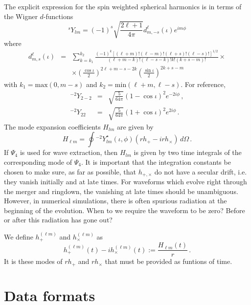 \documentclass{article}
\numberwithin{equation}{section}
\newcommand{\Ys}{{{}^sY}}
\newcommand{\Ytwo}{{{}^{-2}Y}}
\begin{document}
The explicit expression for the spin weighted spherical harmonics is
in terms of the Wigner $d$-functions
\begin{equation}
  \label{eq:5}
   \Ys_{lm} = (-1)^s\sqrt{\frac{2\ell+1}{4\pi}} d^\ell_{m,-s}(\iota)e^{im\phi}
\end{equation}
where
\begin{eqnarray}
  \label{eq:6}
  d^\ell_{m,s}(\iota) &=& \sum_{k = k_1}^{k_2}
    \frac{(-1)^k[(\ell+m)!(\ell-m)!(\ell+s)!(\ell-s)!]^{1/2}}{(\ell +m
      -k)!(\ell-s-k)!k!(k+s-m)!} \times \\ 
    &&\times \left(\frac{\cos\iota}{2}\right)^{2\ell+m-s-2k}\left(\frac{\sin\iota}{2}\right)^{2k+s-m}  
\end{eqnarray}
with $k_1 = \textrm{max}(0, m-s)$ and $k_2=\textrm{min}(\ell+m,
\ell-s)$.  For reference,
\begin{eqnarray}
  \label{eq:7}
  \Ytwo_{2-2} &=& \sqrt{\frac{5}{64\pi}}(1-\cos\iota)^2e^{-2i\phi}\,, \\
  \Ytwo_{22} &=& \sqrt{\frac{5}{64\pi}}(1+\cos\iota)^2e^{2i\phi} \,.
\end{eqnarray}
The mode expansion coefficients $H_{lm}$ are given by
\begin{equation}
  \label{eq:10}
  H_{\ell m} = \oint \Ytwo_{lm}^\star(\iota,\phi)(rh_+-irh_\times )\,d\Omega\,.
\end{equation}
If $\Psi_4$ is used for wave extraction, then $H_{lm}$ is given by two
time integrals of the corresponding mode of $\Psi_4$.  It is important
that the integration constants be chosen to make sure, as far as
possible, that $h_{+,\times}$ do not have a secular drift, i.e. they
vanish initially and at late times.  For waveforms which evolve right
through the merger and ringdown, the vanishing at late times should be
unambiguous.  However, in numerical simulations, there is often spurious
radiation at the beginning of the evolution.  When to we require the
waveform to be zero?  Before or after this radiation has gone out?

We define $h_+^{(\ell m)}$ and $h_\times^{(\ell m)}$ as
\begin{equation}
  \label{eq:11}
  h_+^{(\ell m)}(t) -ih_\times^{(\ell m)}(t) := \frac{H_{\ell m}(t)}{r}\,.  
\end{equation}
It is these modes of $rh_+$ and $rh_\times$ that must be provided as
funtions of time.  





\section{Data formats}
\label{sec:format}
\end{document}
